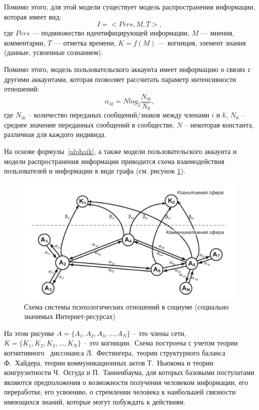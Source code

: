 Помимо этого, для этой модели существует модель распространения информации, которая имеет вид:
\begin{equation}
    I = <Pers, M, T>,
\end{equation}
где $Pers$ — подмножество идентифицирующей информации, $M$ — мнения, комментарии,
$T$ — отметка времени, $K = f(M)$ — когниция, элемент знания (данные, усвоенные сознанием).

Помимо этого, модель пользовательского аккаунта имеет информацию о связях с другими аккаунтами,
которая позволяет рассчитать параметр интенсивности отношений:
\begin{equation}\label{alphaik}
    \alpha_{ik} = N log_{2} \frac{N_{ik}}{N_{0}},
\end{equation}
где $N_{ik}$ – количество переданых сообщений/знаков между членами $i$ и $k$,
$N_{0}$ – среднее значение переданных сообщений в сообществе, $N$ – некоторая константа, различная для каждого индивида.

На основе формулы~\ref{alphaik}, а также модели пользовательского аккаунта и модели распространения информации
приводится схема взаимодействия пользователей и информации в виде графа (см. рисунок \ref{fig:shema_system_in_socium}).

\begin{figure}[h!]
    \centering
    \captionsetup{justification=centering}
    \includegraphics[width=0.8\linewidth]{pictures/schema_system_in_socium.png}
    \caption{Схема системы психологических отношений в социуме (социально значимых Интернет-ресурсах)~\citep{pilkevich2015model}}
    \label{fig:shema_system_in_socium}
\end{figure}

На этом рисунке $A = \{ A_{1}, A_{2}, A_{3}, \dots, A_{N}\}$ – это члены сети,
$K = \{ K_{1}, K_{2}, K_{3}, \dots, K_{N}\}$ – это когниции.~Схема построена с учетом теории когнитивного
~диссонанса Л.~Фестингера,~теории структурного баланса Ф.~Хайдера, теории коммуникационных актов Т.~Ньюкома
и теории конгруэнтности Ч.~Осгуда и П.~Танненбаума, для которых базовыми постулатами являются предположения
о возможности получения человеком информации, его переработке, его усвоению, о стремлении человека к наибольшей
связности имеющихся знаний, которые могут побуждать к действиям.

